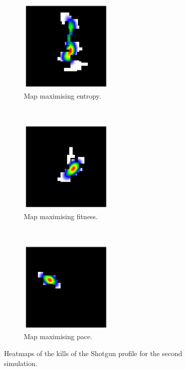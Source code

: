 \begin{figure}[H]
    \centering
    \begin{subfigure}[t]{0.3\textwidth}
        \centering
        \includegraphics[height=4.5cm]{Images/images/experiment_two/best_entropy_pop_1/kills_bot_0.png}
        \caption{Map maximising entropy.}
    \end{subfigure}%
    ~ 
    \begin{subfigure}[t]{0.3\textwidth}
        \centering
        \includegraphics[height=4.5cm]{Images/images/experiment_two/best_fitness_pop_1/kills_bot_0.png}
        \caption{Map maximising fitness.}
    \end{subfigure}
    ~ 
    \begin{subfigure}[t]{0.3\textwidth}
        \centering
        \includegraphics[height=4.5cm]{Images/images/experiment_two/best_pace_pop_1/kills_bot_0.png}
        \caption{Map maximising pace.}
    \end{subfigure}
    \caption{Heatmaps of the kills of the Shotgun profile for the second simulation.}
\end{figure}
